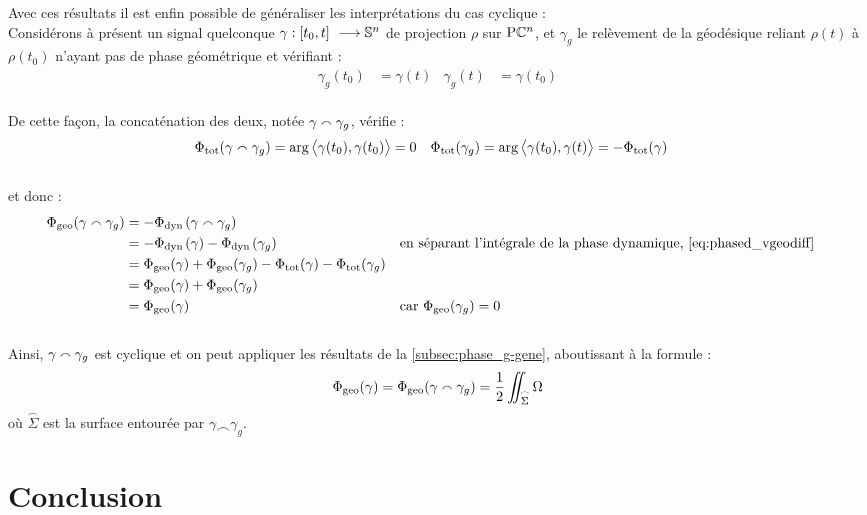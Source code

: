 Avec ces résultats il est enfin possible de généraliser les interprétations du cas cyclique :
\\
Considérons à présent un signal quelconque $\gamma: [t_0,t]\ \longrightarrow \mathbb{ S}^{n}$ de projection $\rho$ sur $\text{\normalfont P}\mathbb{C}^{n}$, et $\gamma_g$ le relèvement de la géodésique reliant $\rho(t)$ à $\rho(t_0)$ n'ayant pas de phase géométrique et vérifiant :
\begin{align*}
\gamma_g(t_0) &= \gamma(t)  &  \gamma_g(t) &= \gamma(t_0)
\end{align*}
\\
De cette façon, la concaténation des deux, notée $\gamma \smallfrown \gamma_g$, vérifie :
\begin{align*}
\Phi_{\text{\normalfont tot}}(\gamma \smallfrown \gamma_g) &= \arg\big\langle \gamma(t_0), \gamma(t_0) \big\rangle =0  &  \Phi_{\text{\normalfont tot}}(\gamma_g) &= \arg\big\langle \gamma(t_0), \gamma(t) \big\rangle = - \Phi_{\text{\normalfont tot}}(\gamma)
\end{align*}
\\
et donc :
\begin{align*}
\Phi_{\text{\normalfont geo}}(\gamma  \smallfrown \gamma_g) &= -\Phi_{\text{\normalfont dyn}\, }(\gamma  \smallfrown \gamma_g) \\
&= -\Phi_{\text{\normalfont dyn}\, }(\gamma) - \Phi_{\text{\normalfont dyn}\, }(\gamma_g)  &  &\text{en séparant l'intégrale de la phase dynamique, \eqref{eq:phased_vgeodiff}} \\
&= \Phi_{\text{\normalfont geo}}(\gamma) + \Phi_{\text{\normalfont geo}}(\gamma_g) - \Phi_{\text{\normalfont tot}}(\gamma) - \Phi_{\text{\normalfont tot}}(\gamma_g) \\
&= \Phi_{\text{\normalfont geo}}(\gamma) + \Phi_{\text{\normalfont geo}}(\gamma_g) \\
&= \Phi_{\text{\normalfont geo}}(\gamma) & &\text{car }\Phi_{\text{\normalfont geo}}(\gamma_g) = 0
\end{align*}
\\

Ainsi, $\gamma \smallfrown \gamma_g$ est cyclique et on peut appliquer les résultats de la \cref{subsec:phase_g-gene}, aboutissant à la formule :
\begin{equation} \label{eq:phase_g-general}
\Phi_{\text{\normalfont geo}}(\gamma) = \Phi_{\text{\normalfont geo}}(\gamma  \smallfrown \gamma_g) = \frac{1}{2} \iint_{\overset{\frown}{\Sigma}} \Omega
\end{equation}
où $\overset{\frown}{\Sigma}$ est la surface entourée par $\gamma \smallfrown \gamma_g$.
\\



\section{Conclusion}

